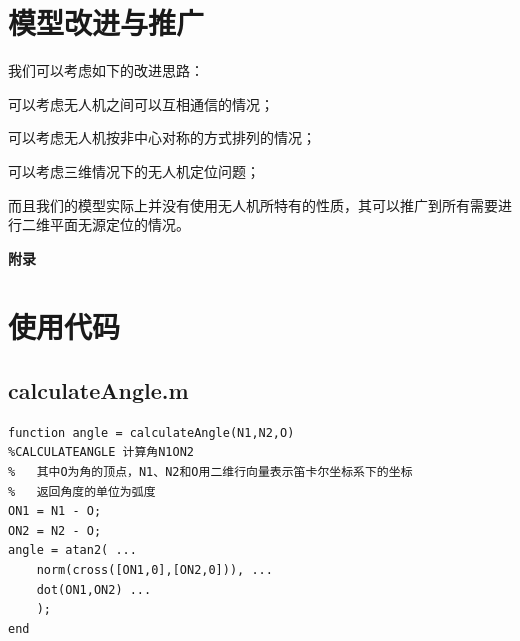 \documentclass[12pt,AutoFakeSlant,AutoFakeBold]{article}
\begin{document}

\section{模型改进与推广}

我们可以考虑如下的改进思路：
\begin{itemize*}
    \item 可以考虑无人机之间可以互相通信的情况；
    \item 可以考虑无人机按非中心对称的方式排列的情况；
    \item 可以考虑三维情况下的无人机定位问题；
\end{itemize*}

而且我们的模型实际上并没有使用无人机所特有的性质，其可以推广到所有需要进行二维平面无源定位的情况。


\nocite{sxjm}





\newpage
\appendix
\centerline{\Large\heiti\textbf{附录}}

\section{使用代码}

\subsection{calculateAngle.m}
\begin{verbatim}
function angle = calculateAngle(N1,N2,O)
%CALCULATEANGLE 计算角N1ON2
%   其中O为角的顶点，N1、N2和O用二维行向量表示笛卡尔坐标系下的坐标
%   返回角度的单位为弧度
ON1 = N1 - O;
ON2 = N2 - O;
angle = atan2( ...
    norm(cross([ON1,0],[ON2,0])), ...
    dot(ON1,ON2) ...
    );
end
\end{verbatim}
\end{document}

